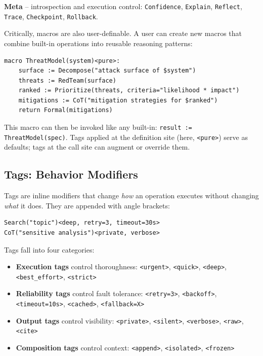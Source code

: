 \documentclass[11pt,a4paper]{article}
\begin{document}
\textbf{Meta} -- introspection and execution control: \texttt{Confidence}, \texttt{Explain}, \texttt{Reflect}, \texttt{Trace}, \texttt{Checkpoint}, \texttt{Rollback}.

\medskip
Critically, macros are also user-definable. A user can create new macros that combine built-in operations into reusable reasoning patterns:

\begin{lstlisting}[language=orchid]
macro ThreatModel(system)<pure>:
    surface := Decompose("attack surface of $system")
    threats := RedTeam(surface)
    ranked := Prioritize(threats, criteria="likelihood * impact")
    mitigations := CoT("mitigation strategies for $ranked")
    return Formal(mitigations)
\end{lstlisting}

This macro can then be invoked like any built-in: \texttt{result := ThreatModel(spec)}. Tags applied at the definition site (here, \texttt{<pure>}) serve as defaults; tags at the call site can augment or override them.

\subsection{Tags: Behavior Modifiers}

Tags are inline modifiers that change \emph{how} an operation executes without changing \emph{what} it does. They are appended with angle brackets:

\begin{lstlisting}[language=orchid]
Search("topic")<deep, retry=3, timeout=30s>
CoT("sensitive analysis")<private, verbose>
\end{lstlisting}

Tags fall into four categories:

\begin{itemize}[leftmargin=*]
  \item \textbf{Execution tags} control thoroughness: \texttt{<urgent>}, \texttt{<quick>}, \texttt{<deep>}, \texttt{<best\_effort>}, \texttt{<strict>}
  \item \textbf{Reliability tags} control fault tolerance: \texttt{<retry=3>}, \texttt{<backoff>}, \texttt{<timeout=10s>}, \texttt{<cached>}, \texttt{<fallback=X>}
  \item \textbf{Output tags} control visibility: \texttt{<private>}, \texttt{<silent>}, \texttt{<verbose>}, \texttt{<raw>}, \texttt{<cite>}
  \item \textbf{Composition tags} control context: \texttt{<append>}, \texttt{<isolated>}, \texttt{<frozen>}
\end{itemize}
\end{document}
